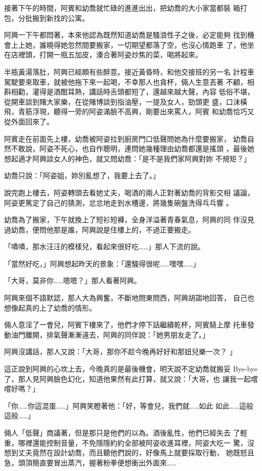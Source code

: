 接著下午的時間，阿賓和幼喬就忙碌的進進出出，把幼喬的大小家當都裝
箱打包，分批搬到新找的公寓。

阿興一下午都悶著，本來他認為既然知道幼喬是騷浪性子之後，必定能夠
找到機會上上她，誰曉得她忽然間要搬家，一切期望都落了空，也沒心情跑車
了，他坐在店裡頭，打開一瓶五加皮，湊合著阿姿炒焦的菜，喝將起來。

半瓶黃湯落肚，阿興已經頗有些醉意。接近黃昏時，和他交接班的另一名
計程車駕駛要來取車，就被他拖下來一起喝，不幸那人也貪杯，倆人生意丟著
不顧，相斟相勸，灌得是酒酣耳熱，講話時舌頭都短了，還越來越大聲，內容
低俗不堪，從開車談到賭大家樂，在從賭博談到指油壓，一提及女人，勁頭更
盛，口沫橫飛，青筋浮現，聽得一旁的阿姿滿臉不高興，剛要出來罵人，阿賓
和幼喬恰巧又從外面回來了。

阿賓走在前面先上樓，幼喬被阿姿拉到廚房門口低聲問她為什麼要搬家，
幼喬自然不敢說，阿姿不死心，也自作聰明，連問她幾種理由幼喬都還是搖頭
，最後她想起適才阿興談女人的神色，就又問幼喬：「是不是我們家阿興對妳
不規矩？」

幼喬只說：「阿姿姐，妳別亂想了，我要上去了。」

說完跑上樓去，阿姿轉頭去看她丈夫，喝酒的兩人正對著幼喬的背影交相
議論，阿姿更篤定了自己的猜測，忿忿地走到水槽邊，將幾隻碗盤洗得乓乓響
。

幼喬為了搬家，下午就換上了短衫短褲，全身洋溢著青春氣息，阿興的同
伴沒見過幼喬，便問他那是誰，阿興說是住樓上的，不過正要搬走。

「嘖嘖，那水汪汪的模樣兒，看起來很好吃……」那人下流的說。

「當然好吃，」阿興想起昨天的景象：「還騷得很呢……嘿嘿……」

「大哥，莫非你……嗯嗯？」那人看著阿興。

阿興來個不語默認，那人大為興奮，不斷地問東問西，阿興胡謅地回答，
自己也想像起真的上了幼喬的情形。

倆人意淫了一會兒，阿賓下樓來了，他們才停下話繼續乾杯，阿賓騎上摩
托車發動油門離開，排氣聲漸漸遠去，阿興的同伴說：「她男朋友走了。」

阿興沒講話，那人又說：「大哥，那你不趁今晚再好好和那妞兒樂一次？
」

這正說到阿興的心坎上去，今晚真的是最後機會，明天說不定幼喬就搬妥
Bye-bye了，那人見阿興臉色幻化，知道他果然有此打算，就又說：「大哥，也
讓我一起嚐嚐好嗎？」

「你……你這混蛋……」阿興笑瞪著他：「好，等會兒，我們就……如此
如此……這般這般……」

倆人「低聲」商議著，但是那只是他們的以為。酒後亂性，他們已經失去
了輕重，哪裡還能控制音量，不免隱隱約約全部被阿姿收進耳裡，阿姿大吃一
驚，沒想到丈夫竟然在設計幼喬，而且聽他們說的，好像馬上就要採取行動，
她既怒且急，頭頂簡直要冒出蒸汽，握著粉拳便想衝出外面來……

